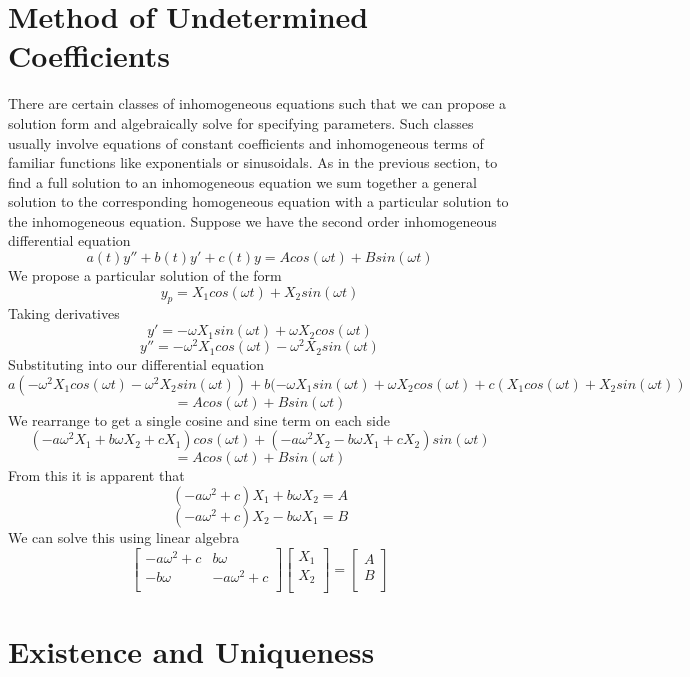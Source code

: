 \section{Method of Undetermined Coefficients}
There are certain classes of inhomogeneous equations such that we can propose a solution form and algebraically solve for specifying parameters. Such classes usually involve equations of constant coefficients and inhomogeneous terms of familiar functions like exponentials or sinusoidals. As in the previous section, to find a full solution to an inhomogeneous equation we sum together a general solution to the corresponding homogeneous equation with a particular solution to the inhomogeneous equation. Suppose we have the second order inhomogeneous differential equation
\[a(t)y'' + b(t)y'+c(t)y = Acos(\omega t) + Bsin(\omega t)\]
We propose a particular solution of the form
\[y_p = X_1cos(\omega t) + X_2sin(\omega t)\]
Taking derivatives
\[y' = -\omega X_1sin(\omega t) + \omega X_2cos(\omega t)\]
\[y'' = -\omega^2X_1cos(\omega t) - \omega^2X_2sin(\omega t)\]
Substituting into our differential equation
\[a(-\omega^2X_1cos(\omega t) - \omega^2X_2sin(\omega t)) + b( -\omega X_1sin(\omega t) + \omega X_2cos(\omega t) + c( X_1cos(\omega t) + X_2sin(\omega t)) \]
\[= Acos(\omega t) + Bsin(\omega t)\]
We rearrange to get a single cosine and sine term on each side
\[(-a\omega^2X_1+b\omega X_2+cX_1)cos(\omega t) + (-a\omega^2X_2 - b\omega X_1 + cX_2)sin(\omega t)\]
\[= Acos(\omega t) + Bsin(\omega t)\]
From this it is apparent that 
\[(-a\omega^2+c)X_1 + b\omega X_2 = A\]
\[(-a\omega^2+c)X_2 - b\omega X_1 = B\]
We can solve this using linear algebra
\[\begin{bmatrix}
    -a\omega^2 + c & b\omega \\
    -b\omega & -a\omega^2 + c\\
\end{bmatrix} \begin{bmatrix}
    X_1 \\
    X_2 \\
\end{bmatrix}
= 
\begin{bmatrix}
    A \\
    B\\
\end{bmatrix}\]

\section{Existence and Uniqueness}




